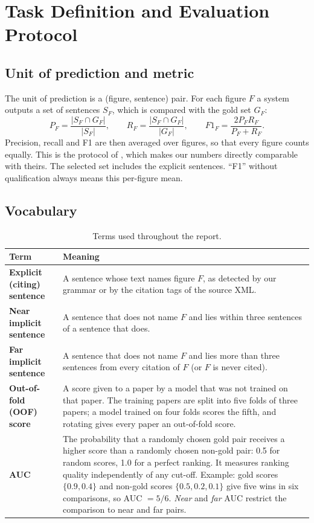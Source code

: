 \section{Task Definition and Evaluation Protocol}
\label{sec:task}

\subsection{Unit of prediction and metric}
The unit of prediction is a (figure, sentence) pair. For each figure $F$ a system outputs a set of sentences
$S_F$, which is compared with the gold set $G_F$:
\[
P_F=\frac{|S_F\cap G_F|}{|S_F|},\qquad R_F=\frac{|S_F\cap G_F|}{|G_F|},\qquad
F1_F=\frac{2P_FR_F}{P_F+R_F}.
\]
Precision, recall and F1 are then averaged over figures, so that every figure counts equally. This is the
protocol of \citet{ramesh2015figsum}, which makes our numbers directly comparable with theirs. The selected set
includes the explicit sentences. ``F1'' without qualification always means this per-figure mean.

\subsection{Vocabulary}
\begin{table}[h]
\centering
\small
\begin{tabularx}{\linewidth}{>{\raggedright\arraybackslash\bfseries}p{3.6cm}L}
\toprule
\textnormal{\textbf{Term}} & \textbf{Meaning}\\
\midrule
Explicit (citing) sentence & A sentence whose text names figure $F$, as detected by our grammar or by the
citation tags of the source XML.\\
Near implicit sentence & A sentence that does not name $F$ and lies within three sentences of a sentence that
does.\\
Far implicit sentence & A sentence that does not name $F$ and lies more than three sentences from every
citation of $F$ (or $F$ is never cited).\\
Out-of-fold (OOF) score & A score given to a paper by a model that was not trained on that paper. The training
papers are split into five folds of three papers; a model trained on four folds scores the fifth, and rotating
gives every paper an out-of-fold score.\\
AUC & The probability that a randomly chosen gold pair receives a higher score than a randomly chosen non-gold
pair: 0.5 for random scores, 1.0 for a perfect ranking. It measures ranking quality independently of any
cut-off. Example: gold scores $\{0.9, 0.4\}$ and non-gold scores $\{0.5, 0.2, 0.1\}$ give five wins in six
comparisons, so AUC $=5/6$. \emph{Near} and \emph{far} AUC restrict the comparison to near and far pairs.\\
\bottomrule
\end{tabularx}
\caption{Terms used throughout the report.}
\label{tab:vocab}
\end{table}

